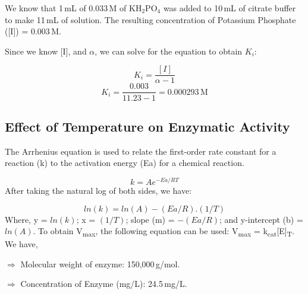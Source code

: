 \documentclass[pdflatex,sn-mathphys]{sn-jnl}%
\theoremstyle{thmstyleone}%
\theoremstyle{thmstyletwo}%
\theoremstyle{thmstylethree}%
\begin{document}
We know that 1\,mL of 0.033\,M of KH$_2$PO$_4$ was added to 10\,mL of citrate
buffer to make 11\,mL of solution. The resulting concentration of Potassium
Phosphate ([I]) = 0.003\,M.

Since we know [I], and $\alpha$, we can solve for the equation to obtain $K_i$:

\[K_i = \frac{[I]}{\alpha - 1}\]
\[K_i = \frac{0.003}{11.23 - 1} = 0.000293\,\text{M}\]

\subsection{Effect of Temperature on Enzymatic Activity}
The Arrhenius equation is used to relate the first-order rate constant for a
reaction (k) to the activation energy (Ea) for a chemical reaction.

\[k = Ae^{-Ea/RT}\]
After taking the natural log of both sides, we have:

\[ln(k) = ln(A) - (Ea/R).(1/T)\]
Where, y = \(ln(k)\); x = \((1/T)\); slope (m) = \(-(Ea/R)\); and y-intercept
(b) = \(ln(A)\). To obtain V\textsubscript{max}, the following equation can be
used: V\textsubscript{max} = k\textsubscript{cat}[E]\textsubscript{T}. We have,

$\Rightarrow$ Molecular weight of enzyme: 150,000\,g/mol.

$\Rightarrow$ Concentration of Enzyme (mg/L): 24.5\,mg/L.
\end{document}
